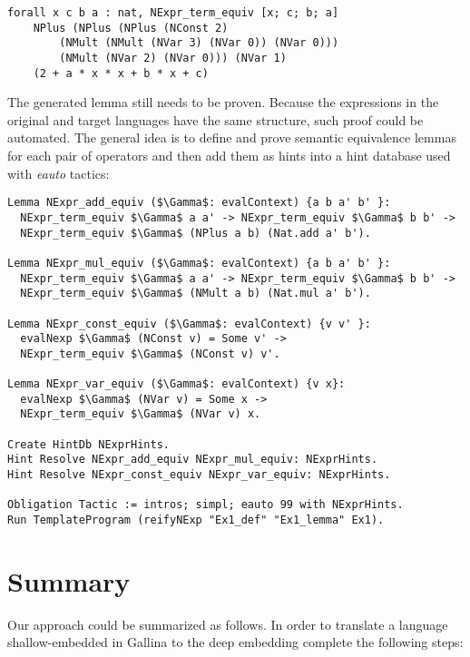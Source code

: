 \documentclass[sigplan]{acmart}\settopmatter{printfolios=true,printccs=false,printacmref=false}
\begin{document}
\begin{lstlisting}[language=Coq, mathescape=true,
  frame=single, basicstyle=\footnotesize]
forall x c b a : nat, NExpr_term_equiv [x; c; b; a]
    NPlus (NPlus (NPlus (NConst 2)
        (NMult (NMult (NVar 3) (NVar 0)) (NVar 0)))
        (NMult (NVar 2) (NVar 0))) (NVar 1)
    (2 + a * x * x + b * x + c)
\end{lstlisting}

The generated lemma still needs to be proven. Because the expressions
in the original and target languages have the same structure, such proof
could be automated. The general idea is to define and prove semantic
equivalence lemmas for each pair of operators and then add them as
hints into a hint database used with \emph{eauto} tactics:

\begin{lstlisting}[language=Coq, mathescape=true,
  frame=single, basicstyle=\footnotesize]
Lemma NExpr_add_equiv ($\Gamma$: evalContext) {a b a' b' }:
  NExpr_term_equiv $\Gamma$ a a' -> NExpr_term_equiv $\Gamma$ b b' ->
  NExpr_term_equiv $\Gamma$ (NPlus a b) (Nat.add a' b').

Lemma NExpr_mul_equiv ($\Gamma$: evalContext) {a b a' b' }:
  NExpr_term_equiv $\Gamma$ a a' -> NExpr_term_equiv $\Gamma$ b b' ->
  NExpr_term_equiv $\Gamma$ (NMult a b) (Nat.mul a' b').

Lemma NExpr_const_equiv ($\Gamma$: evalContext) {v v' }:
  evalNexp $\Gamma$ (NConst v) = Some v' ->
  NExpr_term_equiv $\Gamma$ (NConst v) v'.

Lemma NExpr_var_equiv ($\Gamma$: evalContext) {v x}:
  evalNexp $\Gamma$ (NVar v) = Some x ->
  NExpr_term_equiv $\Gamma$ (NVar v) x.

Create HintDb NExprHints.
Hint Resolve NExpr_add_equiv NExpr_mul_equiv: NExprHints.
Hint Resolve NExpr_const_equiv NExpr_var_equiv: NExprHints.

Obligation Tactic := intros; simpl; eauto 99 with NExprHints.
Run TemplateProgram (reifyNExp "Ex1_def" "Ex1_lemma" Ex1).
\end{lstlisting}

\section{Summary}

Our approach could be summarized as follows. In order to translate a
language shallow-embedded in Gallina to the deep embedding complete
the following steps:
\end{document}
